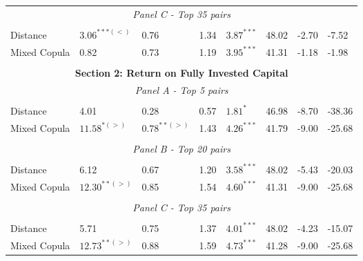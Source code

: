 \documentclass[a4paper,12pt]{report}
\begin{document}
\begin{threeparttable}[H]
\begin{tabularx}{\textwidth}{@{\extracolsep{\fill}}llllllll@{}}
			\multicolumn{8}{c}{\textit{Panel C - Top 35 pairs}} \\
			&       &       &       &       &       &       &  \\
			Distance &  $3.06^{***(<)}$ &  0.76  & 1.34  & $3.87^{***}$  & 48.02 & -2.70  & -7.52 \\
			Mixed Copula & 0.82  & 0.73  & 1.19  & $3.95^{***}$  & 41.31 &  -1.18  &  -1.98  \\
			\multicolumn{1}{r}{} & \multicolumn{1}{r}{} & \multicolumn{1}{r}{} & \multicolumn{1}{r}{} & \multicolumn{1}{r}{} & \multicolumn{1}{r}{} & \multicolumn{1}{r}{} & \multicolumn{1}{r}{} \\
			\midrule
			\multicolumn{8}{c}{\textbf{Section 2: Return on Fully Invested Capital}} \\
			\multicolumn{8}{c}{\textit{Panel A - Top 5 pairs}} \\
			&       &       &       &       &       &       &  \\
			Distance & 4.01  & 0.28  & 0.57  & $1.81^{*}$  & 46.98 & -8.70    & -38.36  \\
			Mixed Copula & $11.58^{*(>)}$  & $0.78^{**(>)}$  & 1.43  & $4.26^{***}$  & 41.79 & -9.00  & -25.68 \\
			\multicolumn{1}{r}{} & \multicolumn{1}{r}{} & \multicolumn{1}{r}{} & \multicolumn{1}{r}{} & \multicolumn{1}{r}{} & \multicolumn{1}{r}{} & \multicolumn{1}{r}{} & \multicolumn{1}{r}{} \\
			\multicolumn{8}{c}{\textit{Panel B - Top 20 pairs}} \\
			&       &       &       &       &       &       &  \\
			Distance & 6.12  & 0.67  & 1.20  & $3.58^{***}$  & 48.02 & -5.43  & -20.03 \\
			Mixed Copula  & $12.30^{**(>)}$  & 0.85  & 1.54  & $4.60^{***}$  & 41.31 & -9.00  & -25.68  \\
			\multicolumn{1}{r}{} & \multicolumn{1}{r}{} & \multicolumn{1}{r}{} & \multicolumn{1}{r}{} & \multicolumn{1}{r}{} & \multicolumn{1}{r}{} & \multicolumn{1}{r}{} & \multicolumn{1}{r}{} \\
			\multicolumn{8}{c}{\textit{Panel C - Top 35 pairs}} \\
			&       &       &       &       &       &       &  \\
			Distance & 5.71  & 0.75  & 1.37  & $4.01^{***}$  & 48.02 & -4.23  & -15.07 \\
			Mixed Copula & $12.73^{**(>)}$  & 0.88  & 1.59  & $4.73^{***}$  & 41.28 & -9.00  & -25.68  \\

\end{tabularx}
\end{threeparttable}
\end{document}

